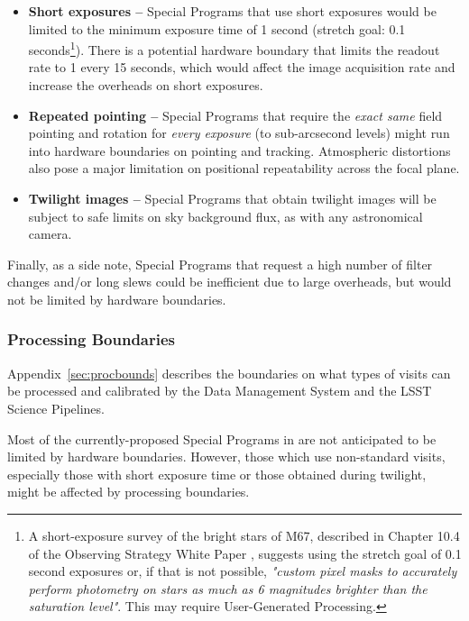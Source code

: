 \begin{itemize}

\item \textbf{Short exposures --}
Special Programs that use short exposures would be limited to the
minimum exposure time of 1 second (stretch goal: 0.1 seconds\footnote{A short-exposure survey 
of the bright stars of M67, described in Chapter 10.4 of the 
Observing Strategy White Paper \citep{2017arXiv170804058L}, suggests using the stretch goal of 
0.1 second exposures or, if that is not possible, \textit{"custom pixel masks to accurately perform 
photometry on stars as much as 6 magnitudes brighter than the saturation level"}. 
This may require User-Generated Processing.}).
There is a potential hardware boundary that limits the readout rate to 1 
every 15 seconds, which would affect the image acquisition rate and 
increase the overheads on short exposures.

\item \textbf{Repeated pointing --}
Special Programs that require the \emph{exact same} field pointing and 
rotation for \emph{every exposure} (to sub-arcsecond levels) might run 
into hardware boundaries on pointing and tracking.
Atmospheric distortions also pose a major limitation on positional
repeatability across the focal plane.

\item \textbf{Twilight images --}
Special Programs that obtain twilight images will be subject to safe
limits on sky background flux, as with any astronomical camera.

\end{itemize}

Finally, as a side note, Special Programs that request a high number of 
filter changes and/or long slews could be inefficient due to large overheads,
but would not be limited by hardware boundaries.

\subsubsection{Processing Boundaries}\label{ssec:proc_bounds_processing}

Appendix~\ref{sec:procbounds} describes the boundaries on what types of visits 
can be processed and calibrated by the Data Management System and the LSST
Science Pipelines.

Most of the currently-proposed Special Programs in 
are not anticipated to be limited by hardware boundaries.
However, those which use non-standard visits, especially those with
short exposure time or those obtained during twilight, might
be affected by processing boundaries.

